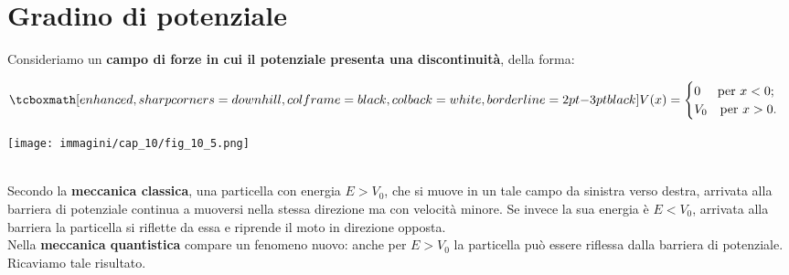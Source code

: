 \documentclass[a4paper,12pt,oneside]{book}
\begin{document}
\section{Gradino di potenziale}
Consideriamo un \textbf{campo di forze in cui il potenziale presenta una discontinuità}, della forma:\\
\begin{minipage}{.55\textwidth}
	\begin{equation}
		\tcboxmath[enhanced, sharp corners=downhill, colframe=black, colback=white, borderline={2pt}{-3pt}{black}]{
			V(x)=
			\begin{cases}
			0 \quad \textrm{ per } x<0;\\
			V_0 \quad \textrm{per } x>0.
			\end{cases}
			}
	\end{equation}
\end{minipage}
\hspace{.2cm}
\begin{minipage}{.4\textwidth}
\texttt{[image: immagini/cap\_10/fig\_10\_5.png]}
\end{minipage}\\

Secondo la \textbf{meccanica classica}, una particella con energia $E>V_0$, che si muove in un tale campo da sinistra verso destra, arrivata alla barriera di potenziale continua a muoversi nella stessa direzione ma con velocità minore. Se invece la sua energia è $E<V_0$, arrivata alla barriera la particella si riflette da essa e riprende il moto in direzione opposta.\\

Nella \textbf{meccanica quantistica} compare un fenomeno nuovo: anche per $E>V_0$ la particella può essere riflessa dalla barriera di potenziale. Ricaviamo tale risultato.\\
\end{document}
